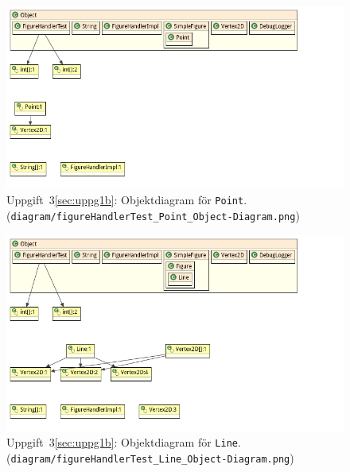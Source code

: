 \begin{figure}[ht]
\centering
\includegraphics[width=\linewidth]{diagram/figureHandlerTest_Point_Object-Diagram.png}
\caption{Uppgift~3\ref{sec:uppg1b}: Objektdiagram för \texttt{Point}.
\\ (\texttt{diagram/figureHandlerTest\_Point\_Object-Diagram.png})}
\label{fig:obj-point}
\end{figure}

\begin{figure}[ht]
\centering
\includegraphics[width=\linewidth]{diagram/figureHandlerTest_Line_Object-Diagram.png}
\caption{Uppgift~3\ref{sec:uppg1b}: Objektdiagram för \texttt{Line}.
\\ (\texttt{diagram/figureHandlerTest\_Line\_Object-Diagram.png})}
\label{fig:obj-line}
\end{figure}

